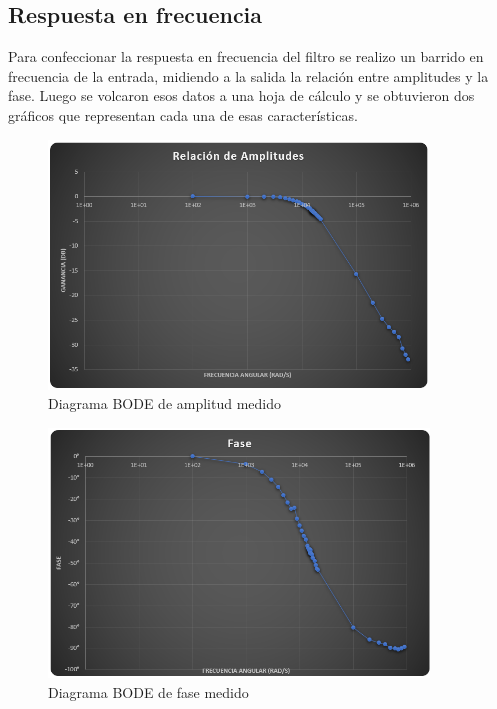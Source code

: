 \subsection{Respuesta en frecuencia}

Para confeccionar la respuesta en frecuencia del filtro se realizo un barrido en frecuencia de la entrada, midiendo a la salida la relaci\'on entre amplitudes y la fase. Luego se volcaron esos datos a una hoja de c\'alculo y se obtuvieron dos gr\'aficos que representan cada una de esas caracter\'isticas.

\begin{figure}[h!]
    \centering
    \includegraphics[width=0.9\textwidth]{EJ2_BODE_amp_medido.png}
    \caption{Diagrama BODE de amplitud medido}
    \label{fig:bode_amp_medido_2} 
\end{figure}


\begin{figure}[h!]
    \centering
    \includegraphics[width=0.9\textwidth]{EJ2_BODE_fase_medido.png}
    \caption{Diagrama BODE de fase medido}
    \label{fig:bode_fase_medido_2} 
\end{figure}

